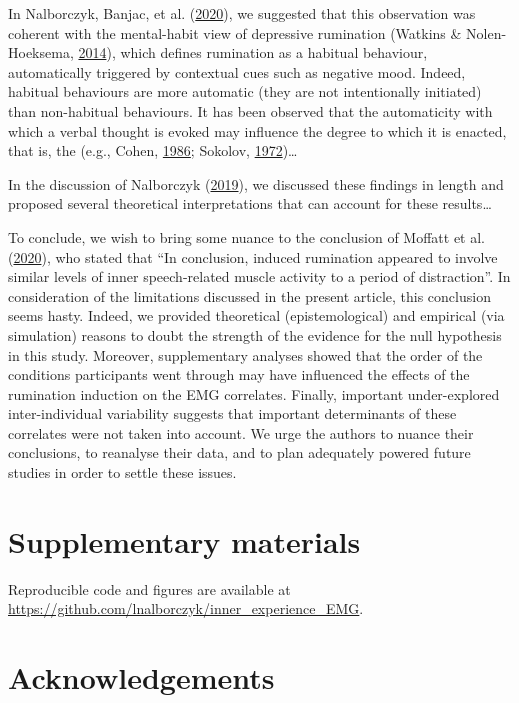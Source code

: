 \documentclass[
  english,
  man, donotrepeattitle,floatsintext]{apa6}
\begin{document}
In Nalborczyk, Banjac, et al. (\protect\hyperlink{ref-nalborczyk_dissociating_2020}{2020}), we suggested that this observation was coherent with the mental-habit view of depressive rumination (Watkins \& Nolen-Hoeksema, \protect\hyperlink{ref-watkins_habit-goal_2014}{2014}), which defines rumination as a habitual behaviour, automatically triggered by contextual cues such as negative mood. Indeed, habitual behaviours are more automatic (they are not intentionally initiated) than non-habitual behaviours. It has been observed that the automaticity with which a verbal thought is evoked may influence the degree to which it is enacted, that is, the (e.g., Cohen, \protect\hyperlink{ref-cohen_motor_1986}{1986}; Sokolov, \protect\hyperlink{ref-sokolov_inner_1972}{1972})\ldots{}

In the discussion of Nalborczyk (\protect\hyperlink{ref-nalborczyk_understanding_2019}{2019}), we discussed these findings in length and proposed several theoretical interpretations that can account for these results\ldots{}

To conclude, we wish to bring some nuance to the conclusion of Moffatt et al. (\protect\hyperlink{ref-moffatt_inner_2020}{2020}), who stated that ``In conclusion, induced rumination appeared to involve similar levels of inner speech-related muscle activity to a period of distraction''. In consideration of the limitations discussed in the present article, this conclusion seems hasty. Indeed, we provided theoretical (epistemological) and empirical (via simulation) reasons to doubt the strength of the evidence for the null hypothesis in this study. Moreover, supplementary analyses showed that the order of the conditions participants went through may have influenced the effects of the rumination induction on the EMG correlates. Finally, important under-explored inter-individual variability suggests that important determinants of these correlates were not taken into account. We urge the authors to nuance their conclusions, to reanalyse their data, and to plan adequately powered future studies in order to settle these issues.

\hypertarget{supp}{%
\section{Supplementary materials}\label{supp}}

Reproducible code and figures are available at \url{https://github.com/lnalborczyk/inner_experience_EMG}.

\hypertarget{acknowledgements}{%
\section*{Acknowledgements}\label{acknowledgements}}
\end{document}
